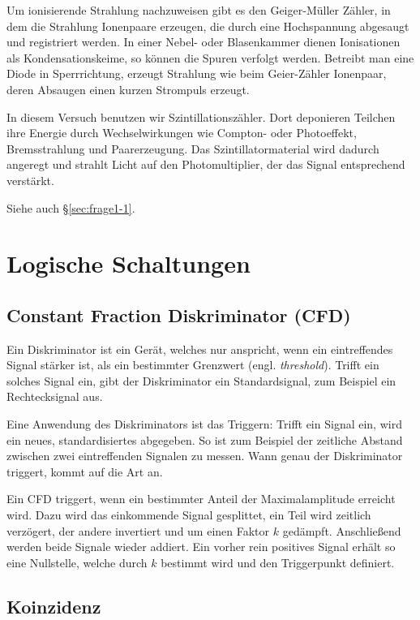 \documentclass[11pt, ngerman, fleqn, DIV=15, headinclude, BCOR=2cm]{scrreprt}
\begin{document}
Um ionisierende Strahlung nachzuweisen gibt es den Geiger-Müller Zähler, in dem
die Strahlung Ionenpaare erzeugen, die durch eine Hochspannung abgesaugt und
registriert werden. In einer Nebel- oder Blasenkammer dienen Ionisationen als
Kondensationskeime, so können die Spuren verfolgt werden. Betreibt man eine
Diode in Sperrrichtung, erzeugt Strahlung wie beim Geier-Zähler Ionenpaar,
deren Absaugen einen kurzen Strompuls erzeugt.

In diesem Versuch benutzen wir Szintillationszähler. Dort deponieren Teilchen
ihre Energie durch Wechselwirkungen wie Compton- oder Photoeffekt,
Bremsstrahlung und Paarerzeugung. Das Szintillatormaterial wird dadurch
angeregt und strahlt Licht auf den Photomultiplier, der das Signal entsprechend
verstärkt.

Siehe auch §\ref{sec:frage1-1}.

\section{Logische Schaltungen}

\subsection{Constant Fraction Diskriminator (CFD)}

Ein Diskriminator ist ein Gerät, welches nur anspricht, wenn ein eintreffendes
Signal stärker ist, als ein bestimmter Grenzwert (engl. \emph{threshold}).
Trifft ein solches Signal ein, gibt der Diskriminator ein Standardsignal, zum
Beispiel ein Rechtecksignal aus.

Eine Anwendung des Diskriminators ist das Triggern: Trifft ein Signal ein, wird
ein neues, standardisiertes abgegeben. So ist zum Beispiel der zeitliche
Abstand zwischen zwei eintreffenden Signalen zu messen. Wann genau der
Diskriminator triggert, kommt auf die Art an.

Ein CFD triggert, wenn ein bestimmter Anteil der Maximalamplitude erreicht
wird. Dazu wird das einkommende Signal gesplittet, ein Teil wird zeitlich
verzögert, der andere invertiert und um einen Faktor $k$ gedämpft. Anschließend
werden beide Signale wieder addiert. Ein vorher rein positives Signal erhält so
eine Nullstelle, welche durch $k$ bestimmt wird und den Triggerpunkt definiert.

\parencite{Ueding/525}

\subsection{Koinzidenz}
\end{document}
